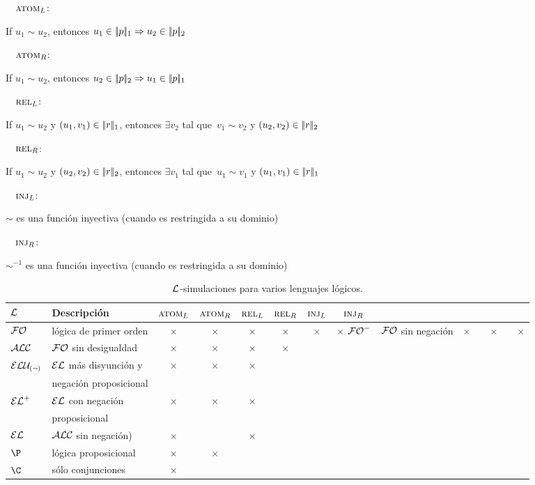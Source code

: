 \newcommand{\simdef}[2]{\noindent\ \ #1\hfill:\ \parbox[t]{.87\textwidth}{#2}\par}

\simdef{$\textsc{atom}_L$}{If $u_1{\sim} u_2$, entonces $u_1 \in |\!|p|\!|_1 \Rightarrow u_2 \in |\!|p|\!|_2$}
\simdef{$\textsc{atom}_R$}{If $u_1{\sim} u_2$, entonces $u_2 \in |\!|p|\!|_2 \Rightarrow u_1 \in |\!|p|\!|_1$}
\simdef{$\textsc{rel}_L$}{If $u_1{\sim} u_2$ y $(u_1,v_1) \in |\!|r|\!|_1$, entonces $\exists v_2$ tal que\ $v_1{\sim}v_2$
  y $(u_2,v_2) \in |\!|r|\!|_2$}
\simdef{$\textsc{rel}_R$}{If $u_1{\sim}u_2$ y $(u_2,v_2) \in |\!|r|\!|_2$, entonces $\exists v_1$ tal que\ $u_1{\sim}v_1$ y
 $(u_1,v_1) \in |\!|r|\!|_1$}
\simdef{$\textsc{inj}_L\space$}{$\sim$ es una funci\'on inyectiva (cuando es restringida a su dominio)}
\simdef{$\textsc{inj}_R\space$}{$\sim^{-1}$ es una funci\'on inyectiva (cuando es restringida a su dominio)}
\smallskip


\begin{table}[t]

\begin{tabular}{|l|l|cccccc|}
\hline
  $\mathcal{L}$ & Descripci\'on &$\textsc{atom}_L$ & $\textsc{atom}_R$ & $\textsc{rel}_L$ & $\textsc{rel}_R$ & $\textsc{inj}_L\space$ & $\textsc{inj}_R\space$ \\
  \hline
  $\mathcal{FO}$ & l\'ogica de primer orden & $\times$ & $\times$ & $\times$ & $\times$ & $\times$ & $\times$  \hline
  ${\mathcal{FO}^-}$ & $\mathcal{FO}$ sin negaci\'on & $\times$ & & $\times$ && $\times$ & \\ \hline 
  $\mathcal{ALC}$   & $\mathcal{FO}$ sin desigualdad & $\times$ & $\times$ & $\times$ & $\times$&& \\ \hline
 
	$\mathcal{ELU_{(\neg)} }$ & $\mathcal{EL}$ m\'as disyunci\'on y  & $\times$ & $\times$ &  $\times$ & & & \\ 
	&negaci\'on proposicional&&&&&&\\ \hline
  ${\mathcal{EL}^+}$ & $\mathcal{EL}$ con negaci\'on & $\times$ & $\times$ &  $\times$ & & & \\ 
	&proposicional&&&&&&\\ \hline
	$\mathcal{EL}$   & $\mathcal{ALC}$ sin negaci\'on) & $\times$ & &  $\times$ & & & \\ \hline
	$\P$ & l\'ogica proposicional& $\times$ & $\times$ & & & & \\ 
	$\C$ & s\'olo conjunciones& $\times$ &  &  & & & \\ 
	
\hline	
\end{tabular}

\caption{$\mathcal{L}$-simulaciones para varios lenguajes l\'ogicos.}\label{tab:simuls}
\end{table}


